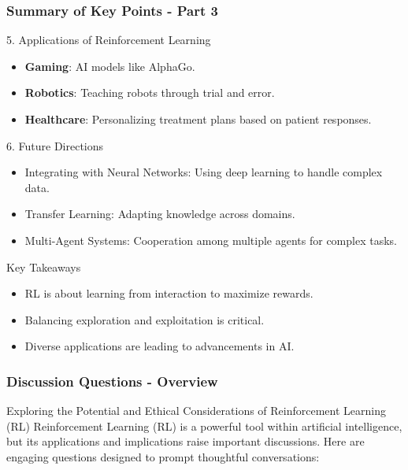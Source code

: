 \documentclass[aspectratio=169]{beamer}
\begin{document}
\begin{frame}[fragile]
    \frametitle{Summary of Key Points - Part 3}
    \begin{block}{5. Applications of Reinforcement Learning}
        \begin{itemize}
            \item \textbf{Gaming}: AI models like AlphaGo.
            \item \textbf{Robotics}: Teaching robots through trial and error.
            \item \textbf{Healthcare}: Personalizing treatment plans based on patient responses.
        \end{itemize}
    \end{block}

    \begin{block}{6. Future Directions}
        \begin{itemize}
            \item Integrating with Neural Networks: Using deep learning to handle complex data.
            \item Transfer Learning: Adapting knowledge across domains.
            \item Multi-Agent Systems: Cooperation among multiple agents for complex tasks.
        \end{itemize}
    \end{block}

    \begin{block}{Key Takeaways}
        \begin{itemize}
            \item RL is about learning from interaction to maximize rewards.
            \item Balancing exploration and exploitation is critical.
            \item Diverse applications are leading to advancements in AI.
        \end{itemize}
    \end{block}
\end{frame}

\begin{frame}[fragile]
  \frametitle{Discussion Questions - Overview}
  \begin{block}{Exploring the Potential and Ethical Considerations of Reinforcement Learning (RL)}
    Reinforcement Learning (RL) is a powerful tool within artificial intelligence, but its applications and implications raise important discussions. Here are engaging questions designed to prompt thoughtful conversations:
  \end{block}
\end{frame}
\end{document}

